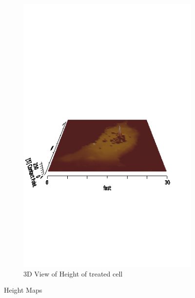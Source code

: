 \documentclass[a4paper,english,12pt,bibliography=totoc]{scrreprt}
\begin{document}
\begin{figure}[H]
\begin{subfigure}{0.45\textwidth}
        \includegraphics[width=\textwidth]{treated/map.png}
        \caption{3D View of Height of treated cell}
        \label{fig:ym_treated}
    \end{subfigure}
    \caption{Height Maps }
    \label{fig:main}
\end{figure}

\end{document}

